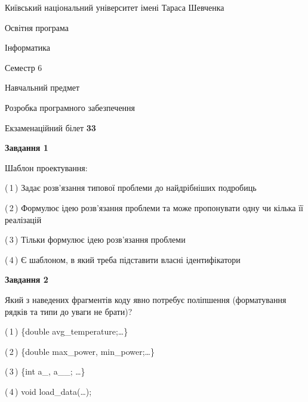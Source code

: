 \documentclass[10pt, ukrainian]{article}
\begin{document}
{{\begin {small}\par
{ \center  Київський національний університет імені Тараса Шевченка \par}
{\parbox {5 cm}{Освітня програма \hfill}{\parbox {7 cm}{Інформатика \hfill}}\parbox {6 cm}{\hfill Семестр 6}}\par
{\parbox {5 cm} {Навчальний предмет \hfill}\parbox {7 cm}{Розробка програмного забезпечення \hfill}\parbox {6cm}{\hfill}\par}\vspace{-7pt} \end{small}}{\center Екзаменаційний білет \No \textbf
{ 33 }\par}}
{
\begin {large}
{\begin {center}\textbf{Завдання 1}\end {center}}\par
Шаблон проектування:\par
\vspace{2mm}



(\,1\,) Задає розв'язання типової проблеми до найдрібніших подробиць%



(\,2\,) Формулює ідею розв'язання проблеми та може пропонувати одну чи кілька її реалізацій%



(\,3\,) Тільки формулює ідею розв'язання проблеми%



(\,4\,) Є шаблоном, в який треба підставити власні ідентифікатори%


{\begin {center}\textbf{Завдання 2}\end {center}}\par
Який з наведених фрагментів коду явно потребує поліпшення (форматування рядків та типи до уваги не брати)?\par
\vspace{2mm}



(\,1\,) \{double avg\_temperature;…\} %



(\,2\,) \{double max\_power, min\_power;…\} %



(\,3\,) \{int a\_, a\_\_; …\}%



(\,4\,) void load\_data(…);%



\end{large}}
\end{document}
